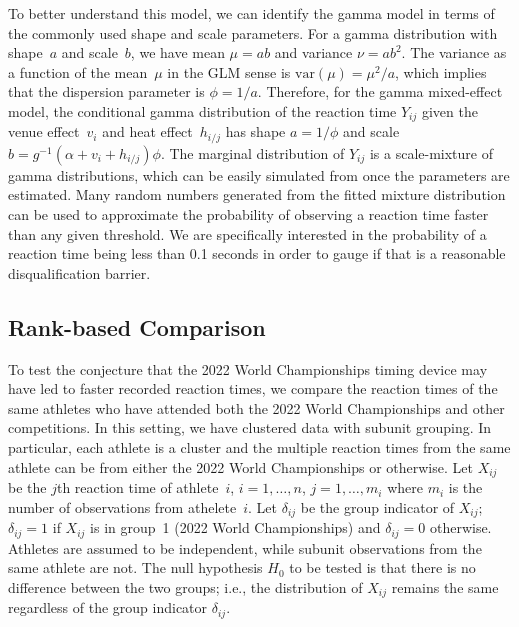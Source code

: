 \documentclass[12pt, letterpaper, titlepage]{article}
\begin{document}
To better understand this model, we can identify the gamma model in terms of the
commonly used shape and scale parameters. For a gamma distribution with
shape~$a$ and scale~$b$, we have mean $\mu = ab$ and variance $\nu = ab^2$. The
variance as a function of the mean~$\mu$ in the GLM sense is
$\text{var}(\mu) = \mu^2 / a$, which implies that the dispersion parameter is
$\phi = 1 / a$. Therefore, for the gamma mixed-effect model, the conditional
gamma distribution of the reaction time $Y_{ij}$ given the venue
effect~$v_i$ and heat effect~$h_{i/j}$
has shape $a = 1 / \phi$ and scale
$b = g^{-1}(\alpha + v_i + h_{i/j}) \phi$. The marginal
distribution of $Y_{ij}$ is a scale-mixture of gamma distributions, which can be
easily simulated from once the parameters are estimated. Many
random numbers generated from the fitted mixture distribution can be used to
approximate the probability of observing a reaction time faster than any given
threshold.  We are specifically interested in the probability of a reaction time
being less than 0.1 seconds in order to gauge if that is a reasonable 
disqualification barrier.


\subsection{Rank-based Comparison}\label{sec:rank}


To test the conjecture that the 2022 World Championships timing device may have 
led to faster recorded reaction times, we compare the reaction times of the same
athletes who have attended both the 2022 World Championships and other 
competitions. 
In this setting, we have clustered data with subunit grouping. In particular,
each athlete is a cluster and the multiple reaction times from the same athlete
can be from either the 2022 World Championships or otherwise.
Let $X_{ij}$ be the $j$th reaction time of athlete~$i$, $i = 1, \ldots, n$,
$j = 1, \ldots, m_i$ where $m_i$ is the number of observations from
athelete~$i$. Let $\delta_{ij}$ be the group indicator of $X_{ij}$; $\delta_{ij}
= 1$ if $X_{ij}$ is in group~1 (2022 World Championships) and $\delta_{ij} = 0$ 
otherwise. Athletes are
assumed to be independent, while subunit observations from the same athlete are
not. The null hypothesis $H_0$ to be tested is that there is no difference
between the two groups; i.e., the distribution of $X_{ij}$ remains the same
regardless of the group indicator $\delta_{ij}$.
\end{document}
